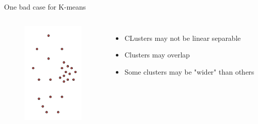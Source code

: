 \documentclass[11.5pt]{beamer}
\begin{document}
\begin{frame}{One bad case for K-means}
\begin{columns}[c]
\column{3cm}
\begin{figure}
\includegraphics[width=3cm]{pics/kmeans_bad_case}
\end{figure}
\column{8cm}
\begin{itemize}
	\item CLusters may not be linear separable
	\item Clusters may overlap
	\item Some clusters may be "wider" than others
\end{itemize}
\end{columns}
\end{frame}
\end{document}
